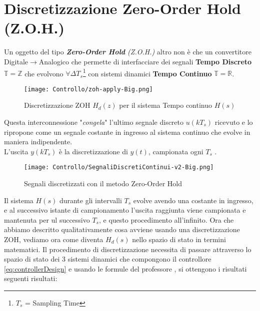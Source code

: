 \section{Discretizzazione Zero-Order Hold (Z.O.H.)}
Un oggetto del tipo \textit{\textbf{Zero-Order Hold} (Z.O.H.)} altro non è che un convertitore Digitale$ \rightarrow $Analogico che permette di interfacciare dei segnali \textbf{Tempo Discreto} $\mathbb{T} =  \mathbb{Z} $ che evolvono $\forall \Delta T_s $\footnote{$ T_s $ = Sampling Time} con sistemi dinamici \textbf{Tempo Continuo} $\mathbb{T} =  \mathbb{R} $.\vspace{-4mm}
\begin{figure}[H]
	\centering
	\caption[Discretizzazione Zero-Order Hold  $ H_d(z) $ del sistema Tempo continuo $ H(s) $]{Discretizzazione ZOH $ H_d(z) $ per il sistema Tempo continuo $ H(s) $}\vspace{4mm}
	\texttt{[image: Controllo/zoh-apply-Big.png]}
\end{figure}
\noindent
Questa interconnessione "\textit{congela}" l'ultimo segnale discreto $ u(k T_s) $ ricevuto e lo ripropone come un segnale costante in ingresso al sistema continuo che evolve in maniera indipendente.\\
L'uscita $ y(k T_s) $ è la discretizzazione di $ y(t) $, campionata ogni $ T_s $ .
\begin{figure}[H]\vspace{-3mm}
	\centering
	\caption[Effetto sui segnali discretizzati con il metodo Zero-Order Hold]{Segnali discretizzati con il metodo Zero-Order Hold}\vspace{2mm}
	\texttt{[image: Controllo/SegnaliDiscretiContinui-v2-Big.png]}
\end{figure}
\noindent
Il sistema $ H(s) $ durante gli intervalli $ T_s $  evolve avendo una costante in ingresso, e al successivo istante di campionamento l'uscita raggiunta viene campionata e mantenuta per ul successivo $ T_s $, e questo procedimento all'infinito.
\newpage
\noindent
Ora che abbiamo descritto qualitativamente cosa avviene usando una discretizzazione ZOH, vediamo ora come diventa $ H_d(s) $ nello spazio di stato in termini matematici. Il procedimento di discretizzazione necessita di passare attraverso lo spazio di stato dei 3 sistemi dinamici che compongono il controllore \ref{eq:controllerDesign} e usando le formule del professore \cite{Discretizzazione}, si ottengono i risultati seguenti risultati:
